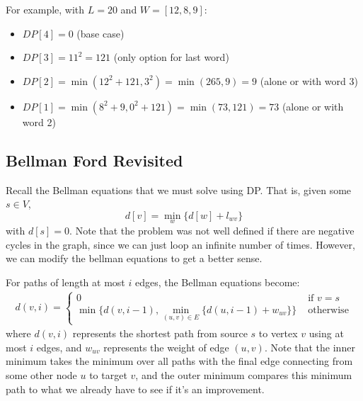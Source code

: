 \documentclass{article}
\begin{document}
    \begin{example}
      For example, with $L=20$ and $W=[12,8,9]$:
      \begin{itemize}
        \item $DP[4] = 0$ (base case)
        \item $DP[3] = 11^2 = 121$ (only option for last word)
        \item $DP[2] = \min(12^2 + 121, 3^2) = \min(265, 9) = 9$ (alone or with word 3)
        \item $DP[1] = \min(8^2 + 9, 0^2 + 121) = \min(73, 121) = 73$ (alone or with word 2)
      \end{itemize}
    \end{example}

  \subsection{Bellman Ford Revisited} 

    Recall the Bellman equations that we must solve using DP. That is, given some $s \in V$, 
    \begin{equation}
      d[v] = \min_w \{ d[w] + l_{wv} \}
    \end{equation}
    with $d[s] = 0$. Note that the problem was not well defined if there are negative cycles in the graph, since we can just loop an infinite number of times. However, we can modify the bellman equations to get a better sense. 

    \begin{theorem}
      For paths of length at most $i$ edges, the Bellman equations become:
      \begin{align}
        d(v,i) = \begin{cases} 
          0 & \text{ if } v = s \\
          \min\{d(v,i-1), \min_{(u, v) \in E} \{d(u,i-1) + w_{uv}\}\} & \text{ otherwise}
        \end{cases}
      \end{align}
      where $d(v,i)$ represents the shortest path from source $s$ to vertex $v$ using at most $i$ edges, and $w_{uv}$ represents the weight of edge $(u, v)$. Note that the inner minimum takes the minimum over all paths with the final edge connecting from some other node $u$ to target $v$, and the outer minimum compares this minimum path to what we already have to see if it's an improvement. 
    \end{theorem} 
\end{document}
